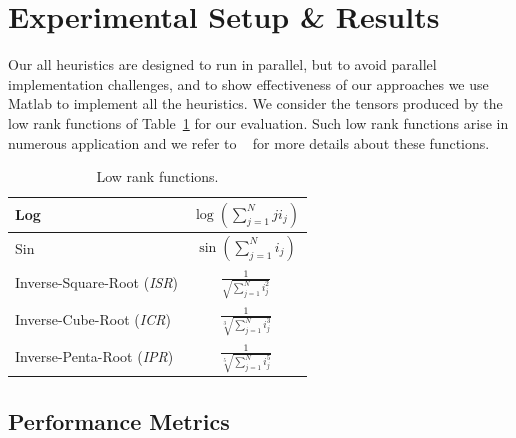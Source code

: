 \documentclass[runningheads]{llncs}
\begin{document}
\section{Experimental Setup \& Results}
\label{sec:expResults}
Our all heuristics are designed to run in parallel, but to avoid parallel implementation challenges, and to show effectiveness of our approaches we use Matlab to implement all the heuristics. We consider the tensors produced by the low rank functions of Table~\ref{tab:lowRankFunctions} for our evaluation. Such low rank functions arise in numerous application and  we refer to ~\cite{lowRankFunctions,lowRankFunction-BM-2005,lowRankFunction-HKT-2005} for more details about these functions.

\begin{table}[htb]
	\centering
	\begin{tabular}{|l|c|}
		\hline
		Log & $\log(\sum_{j=1}^{N}j i_j)$\\ \hline
		Sin & $\sin(\sum_{j=1}^{N}i_j)$\\ \hline
		Inverse-Square-Root (\textit{ISR}) & $\frac{1}{\sqrt{\sum_{j=1}^{N}i_j^2}}$\\ \hline
		Inverse-Cube-Root (\textit{ICR}) & $\frac{1}{\sqrt[3]{\sum_{j=1}^{N}i_j^3}}$\\ \hline
		Inverse-Penta-Root (\textit{IPR}) & $\frac{1}{\sqrt[5]{\sum_{j=1}^{N}i_j^5}}$\\ \hline
	\end{tabular}
	\caption{Low rank functions.\label{tab:lowRankFunctions}}
\end{table}

\subsection{Performance Metrics}
\end{document}
